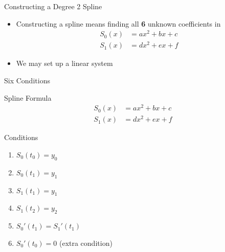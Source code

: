 \documentclass[10pt]{beamer}
\begin{document}


\begin{frame}{Constructing a Degree 2 Spline}
\begin{center}

\end{center}
\begin{itemize}
    \item Constructing a spline means finding all \textbf{6} unknown coefficients in 
    \begin{align*}
    S_0(x) &= ax^2 + bx+c\\
    S_1(x) & = dx^2 + ex+f
    \end{align*}
    \item We may set up a linear system
\end{itemize}

\end{frame}
\begin{frame}{Six Conditions}
\begin{block}{Spline Formula}
    \begin{align*}
    S_0(x) &= ax^2 + bx+c\\
    S_1(x) & = dx^2 + ex+f
    \end{align*}
\end{block}
\begin{block}{Conditions}
\begin{enumerate}
    \item $S_0(t_0)=y_0$
    \item $S_0(t_1)=y_1$
    \item $S_1(t_1)=y_1$
    \item $S_1(t_2)=y_2$
    \item $S_0'(t_1)=S_1'(t_1)$
    \item $S_0'(t_0)=0$  \qquad (extra condition)
\end{enumerate}
\end{block}
    
\end{frame}
\end{document}
